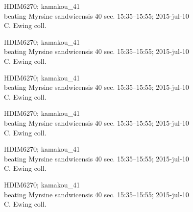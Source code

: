 \documentclass[2pt]{extarticle}
\begin{document}
\noindent
\parbox{0.16\textwidth}{\tiny \raggedright \rule[-0.3\baselineskip]{0pt}{10pt}HDIM6270; kamakou\_41\\ beating Myrsine sandwicensis 40 sec. 15:35--15:55; 2015-jul-10\\ C. Ewing coll.}
\parbox{0.16\textwidth}{\tiny \raggedright \rule[-0.3\baselineskip]{0pt}{10pt}HDIM6270; kamakou\_41\\ beating Myrsine sandwicensis 40 sec. 15:35--15:55; 2015-jul-10\\ C. Ewing coll.}
\parbox{0.16\textwidth}{\tiny \raggedright \rule[-0.3\baselineskip]{0pt}{10pt}HDIM6270; kamakou\_41\\ beating Myrsine sandwicensis 40 sec. 15:35--15:55; 2015-jul-10\\ C. Ewing coll.}
\parbox{0.16\textwidth}{\tiny \raggedright \rule[-0.3\baselineskip]{0pt}{10pt}HDIM6270; kamakou\_41\\ beating Myrsine sandwicensis 40 sec. 15:35--15:55; 2015-jul-10\\ C. Ewing coll.}
\parbox{0.16\textwidth}{\tiny \raggedright \rule[-0.3\baselineskip]{0pt}{10pt}HDIM6270; kamakou\_41\\ beating Myrsine sandwicensis 40 sec. 15:35--15:55; 2015-jul-10\\ C. Ewing coll.}
\parbox{0.16\textwidth}{\tiny \raggedright \rule[-0.3\baselineskip]{0pt}{10pt}HDIM6270; kamakou\_41\\ beating Myrsine sandwicensis 40 sec. 15:35--15:55; 2015-jul-10\\ C. Ewing coll.} \\ 
\vspace{0.001in} 
\end{document}
